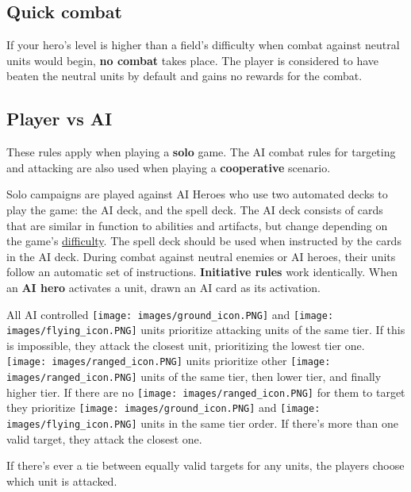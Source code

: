 \documentclass[12pt]{article}
\begin{document}
\subsection*{\hypertarget{Quick}{Quick combat}}
If your hero’s level is higher than a field’s difficulty when combat against neutral units would begin, \textbf{no combat} takes place. The player is considered to have beaten the neutral units by default and gains no rewards for the combat.

\subsection*{\hypertarget{AIrules}{Player vs AI}}
These rules apply when playing a \textbf{solo} game. The AI combat rules for targeting and attacking are also used when playing a \textbf{cooperative} scenario.\par
Solo campaigns are played against AI Heroes who use two automated decks to play the game: the AI deck, and the spell deck. The AI deck consists of cards that are similar in function to abilities and artifacts, but change depending on the game's \hyperlink{Difficulty}{difficulty}. The spell deck should be used
when instructed by the cards in the AI deck. During combat against neutral enemies or AI heroes, their units follow an automatic set of instructions. \textbf{Initiative rules} work identically. When an \textbf{AI hero} activates a unit, drawn an AI card as its activation.\par
All AI controlled \texttt{[image: images/ground\_icon.PNG]} and \texttt{[image: images/flying\_icon.PNG]} units prioritize attacking units of the same tier. If this is impossible, they attack the closest unit, prioritizing the lowest tier one. \texttt{[image: images/ranged\_icon.PNG]} units prioritize other \texttt{[image: images/ranged\_icon.PNG]} units of the same tier, then lower tier, and finally higher tier. If there are no \texttt{[image: images/ranged\_icon.PNG]} for them to target they prioritize \texttt{[image: images/ground\_icon.PNG]} and \texttt{[image: images/flying\_icon.PNG]} units in the same tier order. If there's more than one valid target, they attack the closest one.\par
If there's ever a tie between equally valid targets for any units, the players choose which unit is attacked.
\end{document}

